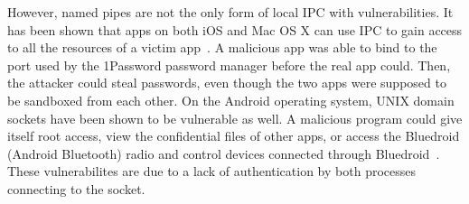 However, named pipes are not the only form of local IPC with vulnerabilities.  It has been shown that apps on both iOS and Mac OS X can use IPC to gain access to all the resources of a victim app~\cite{Xing_2015_CAI_2810103_2813609}.  A malicious app was able to bind to the port used by the 1Password password manager before the real app could.  Then, the attacker could steal passwords, even though the two apps were supposed to be sandboxed from each other.  On the Android operating system, UNIX domain sockets have been shown to be vulnerable as well.  A malicious program could give itself root access, view the confidential files of other apps, or access the Bluedroid (Android Bluetooth) radio and control devices connected through Bluedroid~\cite{Shao_2016_MAU_2976749_2978297}.  These vulnerabilites are due to a lack of authentication by both processes connecting to the socket.